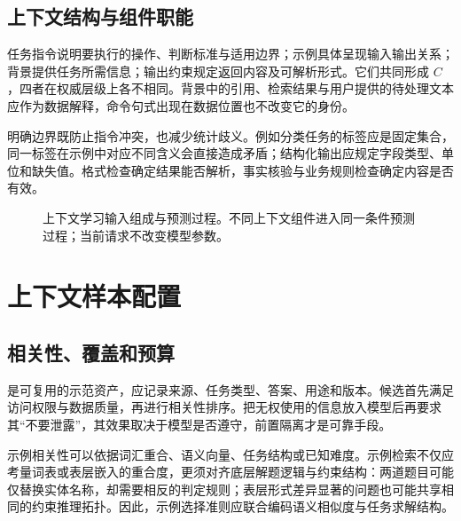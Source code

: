 \documentclass[../textbook.tex]{subfiles}
\begin{document}
\subsection{上下文结构与组件职能}
任务指令说明要执行的操作、判断标准与适用边界；示例具体呈现输入输出关系；背景提供任务所需信息；输出约束规定返回内容及可解析形式。它们共同形成 $C$，四者在权威层级上各不相同。背景中的引用、检索结果与用户提供的待处理文本应作为数据解释，命令句式出现在数据位置也不改变它的身份。

明确边界既防止指令冲突，也减少统计歧义。例如分类任务的标签应是固定集合，同一标签在示例中对应不同含义会直接造成矛盾；结构化输出应规定字段类型、单位和缺失值。格式检查确定结果能否解析，事实核验与业务规则检查确定内容是否有效。

\begin{figure}[htbp]
\centering
{}
\caption[上下文学习输入组成与预测过程]{上下文学习输入组成与预测过程。不同上下文组件进入同一条件预测过程；当前请求不改变模型参数。}\label{fig:icl-context}
\end{figure}

\section{上下文样本配置}

\subsection{相关性、覆盖和预算}
是可复用的示范资产，应记录来源、任务类型、答案、用途和版本。候选首先满足访问权限与数据质量，再进行相关性排序。把无权使用的信息放入模型后再要求其“不要泄露”，其效果取决于模型是否遵守，前置隔离才是可靠手段。

示例相关性可以依据词汇重合、语义向量、任务结构或已知难度。示例检索不仅应考量词表或表层嵌入的重合度，更须对齐底层解题逻辑与约束结构：两道题目可能仅替换实体名称，却需要相反的判定规则；表层形式差异显著的问题也可能共享相同的约束推理拓扑。因此，示例选择准则应联合编码语义相似度与任务求解结构。
\end{document}
